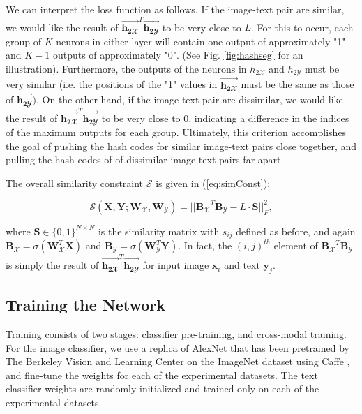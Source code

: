 \documentclass[letterpaper]{article}
\newcommand{\bpx}{\mathbf{B_\mathcal{X}}}
\newcommand{\bpy}{\mathbf{B_\mathcal{Y}}}
\newcommand{\WX}{\mathbf{W}_\mathcal{X}}
\newcommand{\WY}{\mathbf{W}_\mathcal{Y}}
\newcommand{\X}{\mathbf{X}}
\newcommand{\Y}{\mathbf{Y}}
\newcommand{\htwoxv}{\vec{\mathbf{h_{2\mathbfcal{X}}}}}
\newcommand{\htwoyv}{\vec{\mathbf{h_{2\mathbfcal{Y}}}}}
\newcommand{\xii}{\mathbf{x}_i}
\newcommand{\yj}{\mathbf{y}_j}
\begin{document}
We can interpret the loss function as follows. If the image-text pair are similar, we would like the result of $ \htwoxv^T \htwoyv $ to be very close to $ L $. For this to occur, each group of $ K $ neurons in either layer will contain one output of approximately "1" and $ K - 1 $ outputs of approximately "0". (See Fig. \ref{fig:hashseg} for an illustration). Furthermore, the outputs of the neurons in $ h_{2\mathcal{X}} $ and $ h_{2\mathcal{Y}} $ must be very similar (i.e. the positions of the "1" values in $ \htwoxv $ must be the same as those of $ \htwoyv ) $. On the other hand, if the image-text pair are dissimilar, we would like the result of $ \htwoxv^T \htwoyv $ to be very close to 0, indicating a difference in the indices of the maximum outputs for each group. Ultimately, this criterion accomplishes the goal of pushing the hash codes for similar image-text pairs close together, and pulling the hash codes of of dissimilar image-text pairs far apart. 

The overall similarity constraint $ \mathcal{S} $ is given in (\ref{eq:simConst}):

\begin{equation}
\label{eq:simConst}
\mathcal{S}(\X,\Y; \WX, \WY) = \big|\big| \bpx^T \bpy - L \cdot \mathbf{S} \big|\big|_F^2,
\end{equation}

\noindent where $ \mathbf{S} \in \{0,1\}^{N \times N} $ is the similarity matrix with $ s_{ij} $ defined as before, and again $ \bpx = \sigma(\WX^T\X) $ and $ \bpy = \sigma(\WY^T\Y) $. In fact, the $ (i,j)^{th} $ element of $ \bpx^T \bpy $ is simply the result of $ \htwoxv^T \htwoyv $ for input image $ \xii $ and text $ \yj $.

\subsection{Training the Network}

Training consists of two stages: classifier pre-training, and cross-modal training. For the image classifier, we use a replica of AlexNet that has been pretrained by The Berkeley Vision and Learning Center \footnotemark  on the ImageNet \cite{imagenet} dataset using Caffe \cite{caffe}, and fine-tune the weights for each of the experimental datasets. The text classifier weights are randomly initialized and trained only on each of the experimental datasets.
\end{document}
